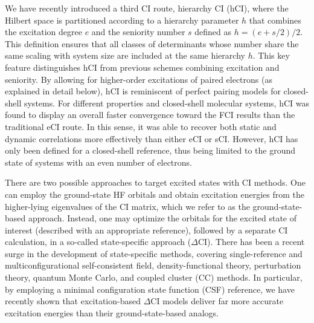 \documentclass[aip,jcp,reprint,noshowkeys,superscriptaddress]{revtex4-1}
\begin{document}
We have recently introduced a third CI route, hierarchy CI (hCI), \cite{Kossoski_2022}
where the Hilbert space is partitioned according to a hierarchy parameter $h$ that combines the excitation degree $e$ and the seniority number $s$ defined as $h = (e+s/2)/2$.
This definition ensures that all classes of determinants whose number share the same scaling with system size are included at the same hierarchy $h$.
This key feature distinguishes hCI from previous schemes combining excitation and seniority. \cite{Alcoba_2014,Raemdonck_2015,Alcoba_2018}
By allowing for higher-order excitations of paired electrons (as explained in detail below), hCI is reminiscent of perfect pairing models for closed-shell systems. \cite{Hurley_1953,Cullen_1996,VanVoorhis_2000,Parkhill_2009,Parkhill_2010,Lehtola_2016,Lehtola_2018}
For different properties and closed-shell molecular systems,
hCI was found to display an overall faster convergence toward the FCI results than the traditional eCI route. \cite{Kossoski_2022}
In this sense, it was able to recover both static and dynamic correlations more effectively than either eCI or sCI.
However, hCI has only been defined for a closed-shell reference, thus being limited to the ground state of systems with an even number of electrons.

There are two possible approaches to target excited states with CI methods.
One can employ the ground-state HF orbitals and obtain excitation energies from the higher-lying eigenvalues of the CI matrix, which we refer to as the ground-state-based approach.
Instead, one may optimize the orbitals for the excited state of interest (described with an appropriate reference), followed by a separate CI calculation,
in a so-called state-specific approach ($\Delta$CI).
There has been a recent surge in the development of state-specific methods, covering
single-reference and multiconfigurational self-consistent field,
\cite{Ziegler_1977,Burton_2021,Shea_2018,Tran_2019,Tran_2020,Hardikar_2020,Shea_2020,Burton_2021,Burton_2022,Hanscam_2022,Kossoski_2023,Marie_2023,Tran_2023}
density-functional theory,
\cite{Filatov_1999,Kowalczyk_2011,Kowalczyk_2013,Gilbert_2008,Barca_2018,Hait_2020,Hait_2021,Zhao_2020,Levi_2020,Carter-Fenk_2020,Toffoli_2022,Schmerwitz_2022,Schmerwitz_2023}
perturbation theory, \cite{Clune_2020,Zhao_2020b,Clune_2023}
quantum Monte Carlo, \cite{Scemama_2018a,Scemama_2018b,Dash_2018,Dash_2019,Dash_2021,Cuzzocrea_2022,Shepard_2022,Otis_2020,Otis_2023}
and coupled cluster (CC)
\cite{Piecuch_2000,Mayhall_2010,Lee_2019,Kossoski_2021,Marie_2021,Rishi_2023,Tuckman_2023}
methods.
In particular, by employing a minimal configuration state function (CSF) reference,
we have recently shown that excitation-based $\Delta$CI models deliver far more accurate excitation energies than their ground-state-based analogs. \cite{Kossoski_2023}
\end{document}
